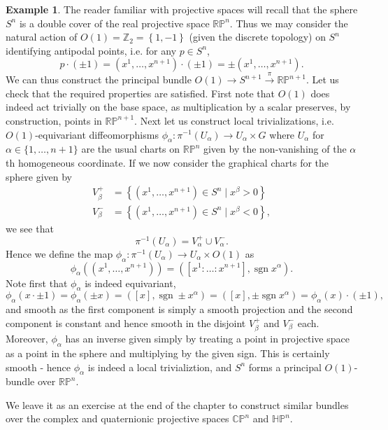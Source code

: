 \documentclass{book}
\newcommand{\Z}{\mathbb{Z}}
\newcommand{\CP}{\mathbb{C}\mathbb{P}}
\newcommand{\RP}{\mathbb{R}\mathbb{P}}
\newcommand{\Proj}{\mathbb{P}}
\newcommand{\HH}{\mathbb{H}}
\DeclareMathOperator{\sgn}{sgn}
\theoremstyle{plain}
\theoremstyle{definition}
\newtheorem{exmp}{Example}
\theoremstyle{remark}
\begin{document}
\begin{exmp}
    The reader familiar with projective spaces will recall that the sphere $S^n$ is a double cover of the real projective space $\RP^n$.
    Thus we may consider the natural action of $O(1)=\Z_2=\left\{ 1,-1 \right\}$ (given the discrete topology) on $S^n$ identifying antipodal points,
    i.e. for any $p\in S^n$,
    \[p\cdot (\pm 1)=(x^1,\ldots, x^{n+1})\cdot (\pm 1)=\pm (x^1,\ldots,x^{n+1}).\]
    We can thus construct the principal bundle $O(1)\to S^{n+1}\overset{\pi}{\to} \RP^{n+1}$. Let us check that the required properties are satisfied.
    First note that $O(1)$ does indeed act trivially on the base space, as multiplication by a scalar preserves, by construction, points in $\RP^{n+1}$.
    Next let us construct local trivializations, i.e. $O(1)$-equivariant diffeomorphisms $\phi_\alpha:\pi^{-1}(U_\alpha)\to U_\alpha\times G$ where
    $U_\alpha$ for $\alpha\in\{1,\ldots, n+1\}$ are the usual charts on $\RP^n$ given by the non-vanishing of the $\alpha$th homogeneous coordinate.
    If we now consider the graphical charts for the sphere given by 
    \begin{align*}
        V_\beta^+&=\left\{ (x^1,\ldots,x^{n+1})\in S^n\mid x^\beta>0 \right\}\\
        V_\beta^-&=\left\{ (x^1,\ldots,x^{n+1})\in S^n\mid x^\beta<0 \right\},
    \end{align*}
    we see that
    \[\pi^{-1}(U_\alpha)=V_\alpha^+\cup V_\alpha^-.\]
    Hence we define the map $\phi_\alpha:\pi^{-1}(U_\alpha)\to U_\alpha\times O(1)$ as
    \[\phi_\alpha\left( (x^1,\ldots,x^{n+1}) \right)=\left( [x^1:\ldots:x^{n+1}], \sgn x^{\alpha} \right).\]
    Note first that $\phi_\alpha$ is indeed equivariant,
    \[\phi_\alpha(x\cdot \pm 1)=\phi_\alpha(\pm x)=([x],\sgn \pm x^\alpha)=([x],\pm \sgn x^\alpha)=\phi_\alpha(x)\cdot (\pm 1),\]
    and smooth as the first component is simply a smooth projection and the second component is constant and hence smooth in the disjoint $V_\beta^+$
    and $V_\beta^-$ each. Moreover, $\phi_\alpha$ has an inverse given simply by treating a point in projective space as a point in the sphere
    and multiplying by the given sign. This is certainly smooth - hence $\phi_\alpha$ is indeed a local trivializtion, and $S^n$ forms a principal
    $O(1)$-bundle over $\RP^n$.

    We leave it as an exercise at the end of the chapter to construct similar bundles over the complex and quaternionic projective spaces $\CP^n$ and $\HH\Proj^n$.
\end{exmp}
\end{document}
